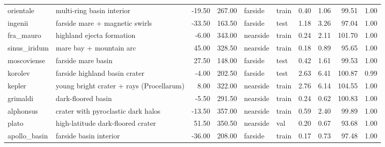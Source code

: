 \begin{tabular}{llrrllrrrr}
orientale & multi-ring basin interior & -19.50 & 267.00 & farside & train & 0.40 & 1.06 & 99.51 & 1.00 \\
ingenii & farside mare + magnetic swirls & -33.50 & 163.50 & farside & test & 1.18 & 3.26 & 97.04 & 1.00 \\
fra\_mauro & highland ejecta formation & -6.00 & 343.00 & nearside & train & 0.24 & 2.11 & 101.70 & 1.00 \\
sinus\_iridum & mare bay + mountain arc & 45.00 & 328.50 & nearside & train & 0.18 & 0.89 & 95.65 & 1.00 \\
moscoviense & farside mare basin & 27.50 & 148.00 & farside & test & 0.42 & 1.61 & 99.53 & 1.00 \\
korolev & farside highland basin crater & -4.00 & 202.50 & farside & test & 2.63 & 6.41 & 100.87 & 0.99 \\
kepler & young bright crater + rays (Procellarum) & 8.00 & 322.00 & nearside & train & 2.76 & 6.14 & 104.55 & 1.00 \\
grimaldi & dark-floored basin & -5.50 & 291.50 & nearside & train & 0.24 & 0.62 & 100.83 & 1.00 \\
alphonsus & crater with pyroclastic dark halos & -13.50 & 357.00 & nearside & train & 0.59 & 2.40 & 99.89 & 1.00 \\
plato & high-latitude dark-floored crater & 51.50 & 350.50 & nearside & val & 0.20 & 0.67 & 93.68 & 1.00 \\
apollo\_basin & farside basin interior & -36.00 & 208.00 & farside & train & 0.17 & 0.73 & 97.48 & 1.00 \\
\bottomrule
\end{tabular}
